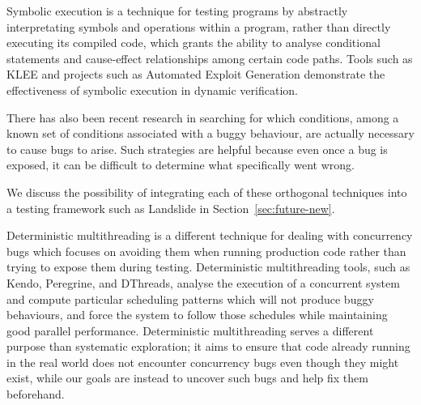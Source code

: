 Symbolic execution\cite{symbolic,symbolic-disks} is a technique for testing programs by abstractly interpretating symbols and operations within a program, rather than directly executing its compiled code, which grants the ability to analyse conditional statements and cause-effect relationships among certain code paths.
Tools such as KLEE\cite{klee} and projects such as Automated Exploit Generation\cite{aeg} demonstrate the effectiveness of symbolic execution in dynamic verification.

There has also been recent research in searching for which conditions, among a known set of conditions associated with a buggy behaviour, are actually necessary to cause bugs to arise\cite{dag-mining}. Such strategies are helpful because even once a bug is exposed, it can be difficult to determine what specifically went wrong.

We discuss the possibility of integrating each of these orthogonal techniques into a testing framework such as Landslide in Section~\ref{sec:future-new}.

Deterministic multithreading is a different technique for dealing with concurrency bugs which focuses on avoiding them when running production code rather than trying to expose them during testing. Deterministic multithreading tools, such as Kendo\cite{kendo}, Peregrine\hspace{0in}\cite{peregrine}, and DThreads\cite{dthreads}, analyse the execution of a concurrent system and compute particular scheduling patterns which will not produce buggy behaviours, and force the system to follow those schedules while maintaining good parallel performance.
Deterministic multithreading serves a different purpose than systematic exploration; it aims to ensure that code already running in the real world does not encounter concurrency bugs even though they might exist, while our goals are instead to uncover such bugs and help fix them beforehand.

